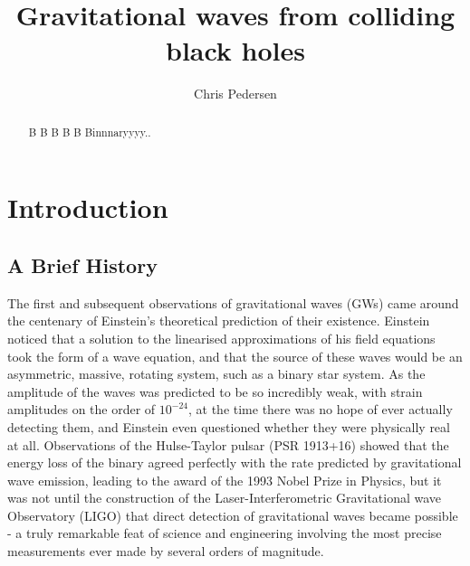 \documentclass[]{article}
\title{Gravitational waves from colliding black holes}
\author{Chris Pedersen}
\begin{document}
\maketitle

\begin{abstract}
B B B B B Binnnaryyyy.. 
\end{abstract}

\section{Introduction}
\subsection{A Brief History}
The first\cite{obs} and subsequent\cite{obs2} observations of gravitational waves (GWs) came around the centenary of Einstein's theoretical prediction of their existence\cite{eins1}\cite{eins2}. Einstein noticed that a solution to the linearised approximations of his field equations took the form of a wave equation\cite{gw1}, and that the source of these waves would be an asymmetric, massive, rotating system, such as a binary star system. As the amplitude of the waves was predicted to be so incredibly weak, with strain amplitudes on the order of $10^{-24}$, at the time there was no hope of ever actually detecting them, and Einstein even questioned whether they were physically real at all\cite{eins3}. Observations of the Hulse-Taylor pulsar (PSR 1913+16)\cite{hulse} showed that the energy loss of the binary agreed perfectly with the rate predicted by gravitational wave emission, leading to the award of the 1993 Nobel Prize in Physics, but it was not until the construction of the Laser-Interferometric Gravitational wave Observatory (LIGO) that direct detection of gravitational waves became possible - a truly remarkable feat of science and engineering involving the most precise measurements ever made by several orders of magnitude.
\end{document}
